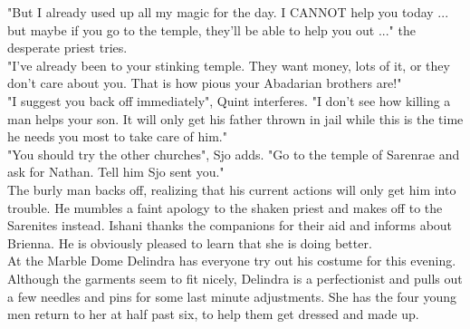 "But I already used up all my magic for the day. I CANNOT help you today ... but maybe if you go to the temple, they'll be able to help you out ..." the desperate priest tries.\\

"I've already been to your stinking temple. They want money, lots of it, or they don't care about you. That is how pious your Abadarian brothers are!"\\

"I suggest you back off immediately", Quint interferes. "I don't see how killing a man helps your son. It will only get his father thrown in jail while this is the time he needs you most to take care of him."\\

"You should try the other churches", Sjo adds. "Go to the temple of Sarenrae and ask for Nathan. Tell him Sjo sent you."\\

The burly man backs off, realizing that his current actions will only get him into trouble. He mumbles a faint apology to the shaken priest and makes off to the Sarenites instead. Ishani thanks the companions for their aid and informs about Brienna. He is obviously pleased to learn that she is doing better.\\

At the Marble Dome Delindra has everyone try out his costume for this evening. Although the garments seem to fit nicely, Delindra is a perfectionist and pulls out a few needles and pins for some last minute adjustments. She has the four young men return to her at half past six, to help them get dressed and made up.\\

